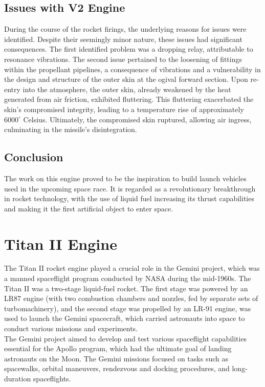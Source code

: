 \documentclass[8pt]{article} %
\begin{document}
\subsection{Issues with V2 Engine}
During the course of the rocket firings, the underlying reasons for issues were identified. Despite their seemingly minor nature, these issues had significant consequences. The first identified problem was a dropping relay, attributable to resonance vibrations. The second issue pertained to the loosening of fittings within the propellant pipelines, a consequence of vibrations and a vulnerability in the design and structure of the outer skin at the ogival forward section. Upon re-entry into the atmosphere, the outer skin, already weakened by the heat generated from air friction, exhibited fluttering. This fluttering exacerbated the skin's compromised integrity, leading to a temperature rise of approximately $6000^{\circ}$ Celsius. Ultimately, the compromised skin ruptured, allowing air ingress, culminating in the missile's disintegration.\cite{The German V2}
\subsection{Conclusion}
The work on this engine proved to be the inspiration to build launch vehicles used in the upcoming space race.  It is regarded as a revolutionary breakthrough in rocket technology, with the use of liquid fuel increasing its thrust capabilities and making it the first artificial object to enter space.

\section{Titan II Engine}
The Titan II rocket engine played a crucial role in the Gemini project, which was a manned spaceflight program conducted by NASA during the mid-1960s. The Titan II was a two-stage liquid-fuel rocket. The first stage was powered by an LR87 engine (with two combustion chambers and nozzles, fed by separate sets of turbomachinery), and the second stage was propelled by an LR-91 engine, was used to launch the Gemini spacecraft, which carried astronauts into space to conduct various missions and experiments.\cite{Titan II GLV}\\
The Gemini project aimed to develop and test various spaceflight capabilities essential for the Apollo program, which had the ultimate goal of landing astronauts on the Moon. The Gemini missions focused on tasks such as spacewalks, orbital maneuvers, rendezvous and docking procedures, and long-duration spaceflights.
\end{document}
